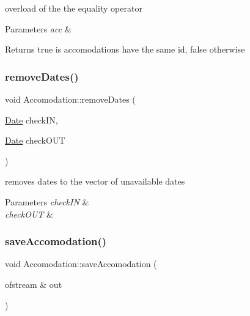 overload of the the equality operator 


\begin{DoxyParams}{Parameters}
{\em acc} & \\
\hline
\end{DoxyParams}
\begin{DoxyReturn}{Returns}
true is accomodations have the same id, false otherwise 
\end{DoxyReturn}
\hypertarget{class_accomodation_ad77bdf46460657e8670001c91bce72b3}{}\label{class_accomodation_ad77bdf46460657e8670001c91bce72b3} 
\subsubsection{\texorpdfstring{remove\+Dates()}{removeDates()}}
{\footnotesize\ttfamily void Accomodation\+::remove\+Dates (\begin{DoxyParamCaption}\item[{\hyperlink{class_date}{Date}}]{check\+IN,  }\item[{\hyperlink{class_date}{Date}}]{check\+O\+UT }\end{DoxyParamCaption})}



removes dates to the vector of unavailable dates 


\begin{DoxyParams}{Parameters}
{\em check\+IN} & \\
\hline
{\em check\+O\+UT} & \\
\hline
\end{DoxyParams}
\hypertarget{class_accomodation_a4394eb907b2d5a23faf73dd03c1dac4d}{}\label{class_accomodation_a4394eb907b2d5a23faf73dd03c1dac4d} 
\subsubsection{\texorpdfstring{save\+Accomodation()}{saveAccomodation()}}
{\footnotesize\ttfamily void Accomodation\+::save\+Accomodation (\begin{DoxyParamCaption}\item[{ofstream \&}]{out }\end{DoxyParamCaption})\hspace{0.3cm}{\ttfamily [virtual]}}



